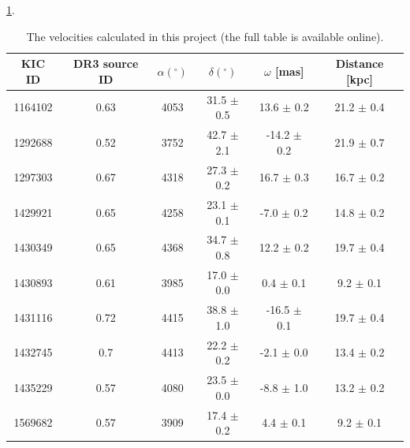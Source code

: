 \ref{tab:data}.
\begin{table}[h!]
  \begin{center}
      \caption{
The velocities calculated in this project (the full table is available
      online).
      }
    \label{tab:data}
\begin{tabular}{cccccc}
    KIC ID & DR3 source ID & $\alpha (^\circ)$ & $\delta (^\circ)$ & $\omega$
    [mas] & Distance [kpc] \\
\hline
1164102 & 0.63 & 4053 & 31.5 $\pm$ 0.5 & 13.6 $\pm$ 0.2 & 21.2 $\pm$ 0.4 \\
1292688 & 0.52 & 3752 & 42.7 $\pm$ 2.1 & -14.2 $\pm$ 0.2 & 21.9 $\pm$ 0.7 \\
1297303 & 0.67 & 4318 & 27.3 $\pm$ 0.2 & 16.7 $\pm$ 0.3 & 16.7 $\pm$ 0.2 \\
1429921 & 0.65 & 4258 & 23.1 $\pm$ 0.1 & -7.0 $\pm$ 0.2 & 14.8 $\pm$ 0.2 \\
1430349 & 0.65 & 4368 & 34.7 $\pm$ 0.8 & 12.2 $\pm$ 0.2 & 19.7 $\pm$ 0.4 \\
1430893 & 0.61 & 3985 & 17.0 $\pm$ 0.0 & 0.4 $\pm$ 0.1 & 9.2 $\pm$ 0.1 \\
1431116 & 0.72 & 4415 & 38.8 $\pm$ 1.0 & -16.5 $\pm$ 0.1 & 19.7 $\pm$ 0.4 \\
1432745 & 0.7 & 4413 & 22.2 $\pm$ 0.2 & -2.1 $\pm$ 0.0 & 13.4 $\pm$ 0.2 \\
1435229 & 0.57 & 4080 & 23.5 $\pm$ 0.0 & -8.8 $\pm$ 1.0 & 13.2 $\pm$ 0.2 \\
1569682 & 0.57 & 3909 & 17.4 $\pm$ 0.2 & 4.4 $\pm$ 0.1 & 9.2 $\pm$ 0.1 \\
\end{tabular}
\end{center}
\end{table}

